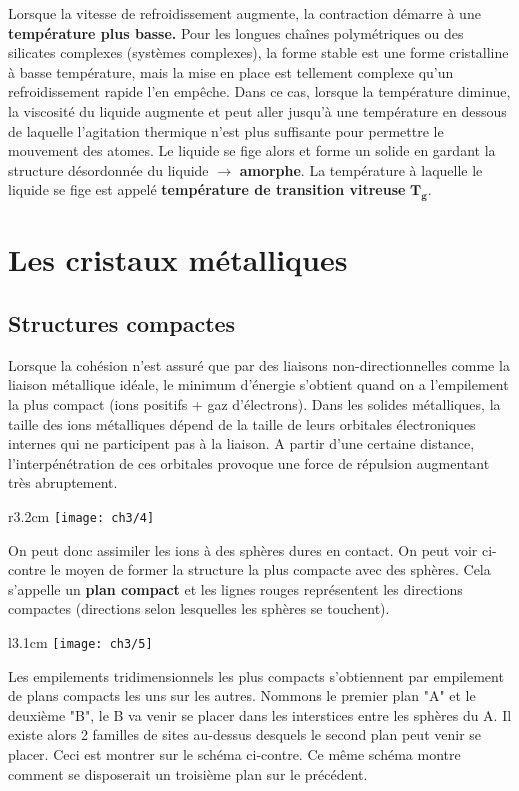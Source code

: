 	Lorsque la vitesse de refroidissement augmente, la contraction démarre à une \textbf{température plus basse.} Pour les longues chaînes polymétriques ou des silicates complexes (systèmes complexes), la forme stable est une forme cristalline à basse température, mais la mise en place est tellement complexe qu'un refroidissement rapide l'en empêche. Dans ce cas, lorsque la température diminue, la viscosité du liquide augmente et peut aller jusqu'à une température en dessous de laquelle l'agitation thermique n'est plus suffisante pour permettre le mouvement des atomes. Le liquide se fige alors et forme un solide en gardant la structure désordonnée du liquide $\rightarrow$ \textbf{amorphe}. La température à laquelle le liquide se fige est appelé \textbf{température de transition vitreuse} $\mathbf{T_g}$.
	
\section{Les cristaux métalliques}
		\subsection{Structures compactes}
			Lorsque la cohésion n'est assuré que par des liaisons non-directionnelles comme la liaison métallique idéale, le minimum d'énergie s'obtient quand on a l'empilement la plus compact (ions positifs + gaz d'électrons). Dans les solides métalliques, la taille des ions métalliques dépend de la taille de leurs orbitales électroniques internes qui ne participent pas à la liaison. A partir d'une certaine distance, l'interpénétration de ces orbitales provoque une force de répulsion augmentant très abruptement. \\
			
			\begin{wrapfigure}[5]{r}{3.2cm}
			\vspace{-5mm}
			\texttt{[image: ch3/4]}
			\end{wrapfigure}
			On peut donc assimiler les ions à des sphères dures en contact. On peut voir ci-contre le moyen de former la structure la plus compacte avec des sphères. Cela s'appelle un \textbf{plan compact} et les lignes rouges représentent les directions compactes (directions selon lesquelles les sphères se touchent).\\
			
			\begin{wrapfigure}[4]{l}{3.1cm}
			\vspace{-7mm}
			\texttt{[image: ch3/5]}
			\end{wrapfigure}
			Les empilements tridimensionnels les plus compacts s'obtiennent par empilement de plans compacts les uns sur les autres. Nommons le premier plan "A" et le deuxième "B", le B va venir se placer dans les interstices entre les sphères du A. Il existe alors 2 familles de sites au-dessus desquels le second plan peut venir se placer. Ceci est montrer sur le schéma ci-contre. Ce même schéma montre comment se disposerait un troisième plan sur le précédent. 
			
